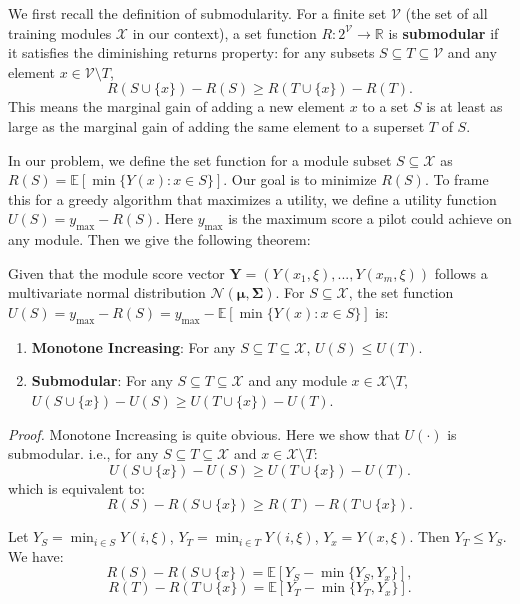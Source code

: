 \documentclass[opre,sglanonrev]{informs4}
\begin{document}
We first recall the definition of submodularity. For a finite set $\mathcal{V}$ (the set of all training modules $\mathcal{X}$ in our context), a set function $R: 2^{\mathcal{V}} \to \mathbb{R}$ is \textbf{submodular} if it satisfies the diminishing returns property: for any subsets $S \subseteq T \subseteq \mathcal{V}$ and any element $x \in \mathcal{V} \setminus T$,
$$
R(S \cup \{x\}) - R(S) \geq R(T \cup \{x\}) - R(T).
$$
This means the marginal gain of adding a new element $x$ to a set $S$ is at least as large as the marginal gain of adding the same element to a superset $T$ of $S$.

In our problem, we define the set function for a module subset $S \subseteq \mathcal{X}$ as $R(S) = \mathbb{E}[\min\{Y(x) : x \in S\}]$. Our goal is to minimize $R(S)$. To frame this for a greedy algorithm that maximizes a utility, we define a utility function $U(S) = y_{\text{max}}-R(S)$. Here $y_{\text{max}}$ is the maximum score a pilot could achieve on any module. Then we give the following theorem:

\begin{theorem}
\label{thm:submodular}
Given that the module score vector $\mathbf{Y} = (Y(x_1,\xi),...,Y(x_m,\xi))$ follows a multivariate normal distribution $\mathcal{N}(\boldsymbol{\mu}, \boldsymbol{\Sigma})$. For $S \subseteq \mathcal{X}$, the set function $U(S) = y_{\text{max}}-R(S) = y_{\text{max}}-\mathbb{E}[\min\{Y(x) : x \in S\}]$ is:
\begin{enumerate}
    \item \textbf{Monotone Increasing}: For any $S \subseteq T \subseteq \mathcal{X}$, $U(S) \leq U(T)$.
    \item \textbf{Submodular}: For any $S \subseteq T \subseteq \mathcal{X}$ and any module $x \in \mathcal{X} \setminus T$, $U(S \cup \{x\}) - U(S) \geq U(T \cup \{x\}) - U(T)$.
\end{enumerate}
\end{theorem}
\textit{Proof.} Monotone Increasing is quite obvious. Here we show that $U(\cdot)$ is submodular. i.e., for any $S \subseteq T \subseteq \mathcal{X}$ and $x \in \mathcal{X} \setminus T$:
$$
U(S \cup \{x\}) - U(S) \geq U(T \cup \{x\}) - U(T).
$$
which is equivalent to:
$$
R(S)-R(S \cup \{x\}) \geq R(T) - R(T \cup \{x\}).
$$

Let $Y_S = \min_{i \in S} Y(i,\xi)$, $Y_T = \min_{i \in T} Y(i,\xi)$, $Y_x = Y(x,\xi)$. Then $Y_T \leq Y_S$. We have:
\[
R(S) - R(S \cup \{x\}) = \mathbb{E}\left[Y_S - \min\{Y_S, Y_x\}\right],
\]
\[
R(T) - R(T \cup \{x\}) = \mathbb{E}\left[Y_T - \min\{Y_T, Y_x\}\right].
\]
\end{document}

